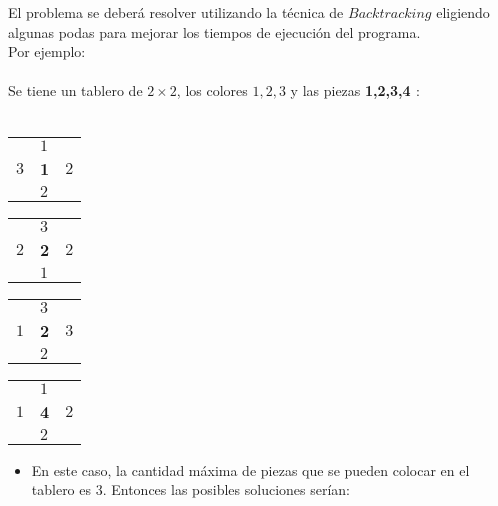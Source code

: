 \documentclass[11pt, a4paper, twoside]{article}
\begin{document}
El problema se deberá resolver utilizando la técnica de $Backtracking$ eligiendo algunas podas para mejorar los tiempos de ejecución del programa. \\

Por ejemplo: \\ 
\\
Se tiene un tablero de $2\times 2$, los colores $1,2,3$ y las piezas \bf 1,\bf 2,\bf 3,\bf 4 $:$ \\
\\

\begin{minipage}{0.2\textwidth}
	\begin{tabular}{ |l l l|}
		\hline
			 & $1$   &       \\
		$3$  & \bf 1 &   $2$ \\ 
			 & $2$   &       \\
		\hline
	\end{tabular}
\end{minipage}
\begin{minipage}{0.2\textwidth}
	\begin{tabular}{ |l l l|}
		\hline
			 & $3$   &       \\
		$2$  & \bf 2 & $2$ \\ 
			 & $1$   &       \\
		\hline
	\end{tabular}
\end{minipage}
\begin{minipage}{0.2\textwidth}
	\begin{tabular}{ |l l l|}
		\hline
			 & $3$    &       \\
		$1$  & \bf 2  & $3$ \\ 
			 & $2$    &       \\
		\hline
	\end{tabular}
\end{minipage}
\begin{minipage}{0.2\textwidth}
	\begin{tabular}{ |l l l|}
		\hline
			 & $1$    &       \\
		$1$  & \bf 4  & $2$   \\ 
			 & $2$    &       \\
		\hline
	\end{tabular} 
\end{minipage}

\begin{itemize}
\item \textnormal{En este caso, la cantidad máxima de piezas que se pueden colocar en el tablero es $3$. Entonces las posibles soluciones serían:} 
\end{itemize}
\end{document}
